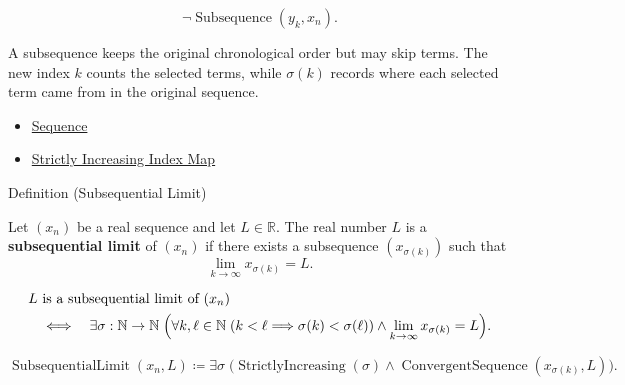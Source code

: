 \begin{remark*}
\[
\neg\operatorname{Subsequence}(y_k,x_n).
\]
\end{remark*}

\begin{remark*}[Interpretation]
A subsequence keeps the original chronological order but may skip terms. The
new index $k$ counts the selected terms, while $\sigma(k)$ records where each
selected term came from in the original sequence.
\end{remark*}

\begin{dependencies}
\begin{itemize}
  \item \hyperref[def:sequence]{Sequence}
  \item \hyperref[def:strictly-increasing-index-map]{Strictly Increasing Index Map}
\end{itemize}
\end{dependencies}


\begin{definitionbox}{Definition (Subsequential Limit)}
\begin{definition}
\label{def:subsequential-limit}
Let $(x_n)$ be a real sequence and let $L\in\mathbb{R}$. The real number
$L$ is a \textbf{subsequential limit} of $(x_n)$ if there exists a
subsequence $(x_{\sigma(k)})$ such that
\[
  \lim_{k\to\infty} x_{\sigma(k)}=L.
\]
\end{definition}
\end{definitionbox}

\begin{remark*}
\[
\begin{aligned}
&L\text{ is a subsequential limit of }(x_n)\\
&\quad\Longleftrightarrow\quad
\exists \sigma:\mathbb{N}\to\mathbb{N}\;
\Bigl(
  \forall k,\ell\in\mathbb{N}\;(k<\ell\Longrightarrow \sigma(k)<\sigma(\ell))
  \land
  \lim_{k\to\infty}x_{\sigma(k)}=L
\Bigr).
\end{aligned}
\]
\end{remark*}

\begin{remark*}
\[
\operatorname{SubsequentialLimit}(x_n,L)
\coloneqq
\exists \sigma\;
\bigl(
  \operatorname{StrictlyIncreasing}(\sigma)
  \land
  \operatorname{ConvergentSequence}(x_{\sigma(k)},L)
\bigr).
\]
\end{remark*}

